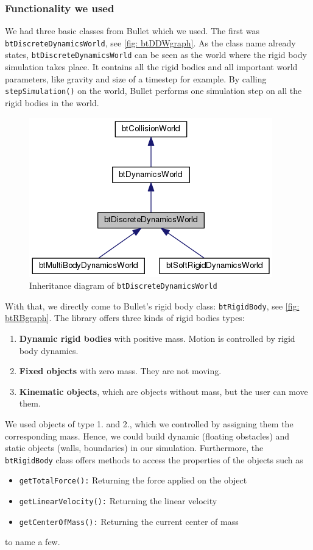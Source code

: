 \subsubsection{Functionality we used}
We had three basic classes from Bullet which we used. The first was \verb+btDiscreteDynamicsWorld+, see \autoref{fig: btDDWgraph}. As the class name already states, \verb+btDiscreteDynamicsWorld+ can be seen as the world where the rigid body simulation takes place. It contains all the rigid bodies and all important world parameters, like gravity and size of a timestep for example. By calling \verb+stepSimulation()+ on the world, Bullet performs one simulation step on all the rigid bodies in the world.

\begin{figure}
\centering
\includegraphics[scale=0.5]{img/RigidBodies/btDiscreteDynamicsWorldGraph.png}
\caption{Inheritance diagram of \texttt{btDiscreteDynamicsWorld}}
\label{fig: btDDWgraph}
\end{figure}

With that, we directly come to Bullet's rigid body class: \verb+btRigidBody+, see \autoref{fig: btRBgraph}. The library offers three kinds of rigid bodies types:
\begin{enumerate}
\item \textbf{Dynamic rigid bodies} with positive mass. Motion is controlled by rigid body dynamics.
\item \textbf{Fixed objects} with zero mass. They are not moving.
\item \textbf{Kinematic objects}, which are objects without mass, but the user can move them.
\end{enumerate}
We used objects of type 1. and 2., which we controlled by assigning them the corresponding mass. Hence, we could build dynamic (floating obstacles) and static objects (walls, boundaries) in our simulation. Furthermore, the \texttt{btRigidBody} class offers methods to access the properties of the objects such as 
\begin{itemize}
\item \texttt{getTotalForce():} Returning the force applied on the object
\item \texttt{getLinearVelocity():} Returning the linear velocity
\item \texttt{getCenterOfMass():} Returning the current center of mass
\end{itemize}
to name a few. 

